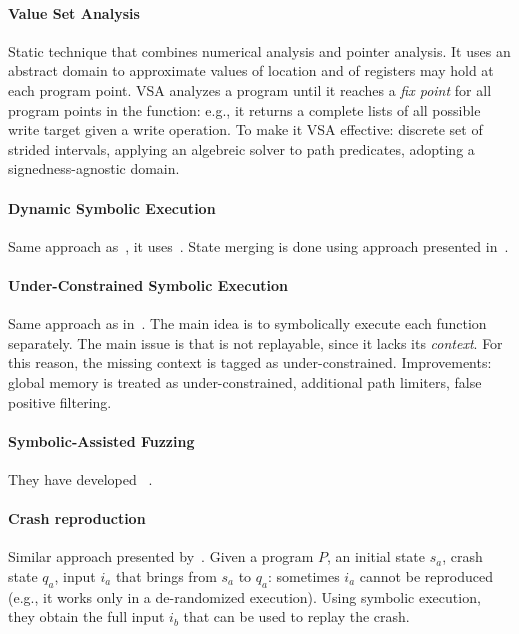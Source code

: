 \paragraph{Value Set Analysis} Static technique that combines numerical analysis and pointer analysis. It uses an abstract domain to approximate values of location and of registers may hold at each program point. VSA analyzes a program until it reaches a {\em fix point} for all program points in the function: e.g., it returns a complete lists of all possible write target given a write operation. To make it VSA effective: discrete set of strided intervals, applying an algebreic solver to path predicates, adopting a signedness-agnostic domain.

\paragraph{Dynamic Symbolic Execution} Same approach as~\cite{MAYHEM-SP12}, it uses~\cite{Z3-TACS08}. State merging is done using approach presented in~\cite{VERITESTING-ICSE14}.

\paragraph{Under-Constrained Symbolic Execution} Same approach as in~\cite{RE-USEC15}. The main idea is to symbolically execute each function separately. The main issue is that is not replayable, since it lacks its {\em context}. For this reason, the missing context is tagged as under-constrained. Improvements: global memory is treated as under-constrained, additional path limiters, false positive filtering.

\paragraph{Symbolic-Assisted Fuzzing} They have developed~ \cite{DRILLER-NDSS16}.

\paragraph{Crash reproduction} Similar approach presented by~\cite{REPLAYER-CCS06}. Given a program $P$, an initial state $s_a$, crash state $q_a$, input $i_a$ that brings from $s_a$ to $q_a$: sometimes $i_a$ cannot be reproduced (e.g., it works only in a de-randomized execution). Using symbolic execution, they obtain the full input $i_b$ that can be used to replay the crash. 

